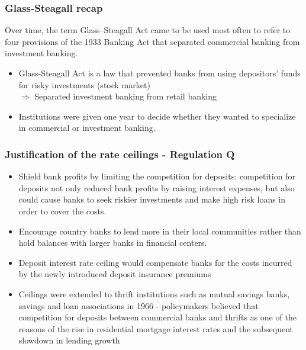 \documentclass[11pt]{beamer}
\begin{document}

\begin{frame}
\frametitle{Glass-Steagall recap}
Over time, the term Glass–Steagall Act came to be used most often to refer to four provisions of the 1933 Banking Act that separated commercial banking from investment banking.\\
\begin{itemize}
\item Glass-Steagall Act is a law that prevented banks from using depositors' funds for risky investments (stock market) \\$\Rightarrow$ Separated investment banking from retail banking
\item Institutions were given one year to decide whether they wanted to specialize in commercial or investment banking.
\end{itemize}
\end{frame}

\begin{frame}
\frametitle{Justification of the rate ceilings - Regulation Q}
\begin{itemize}
\item Shield bank profits by limiting the competition for
deposits: competition for deposits not only reduced bank profits by raising interest expenses, but also could cause banks to seek riskier investments and make high risk loans in order to cover the costs.
\item Encourage country banks to lend more in their local communities rather than hold balances with larger banks in financial centers.
\item {Deposit interest rate ceiling would compensate banks for the costs incurred by the newly introduced
deposit insurance premiums}
\item {Ceilings were extended to thrift institutions} such as
mutual savings banks, savings and loan associations in 1966 - policymakers believed that competition for deposits between commercial banks and thrifts as one of the reasons of the rise in residential mortgage interest rates and the subsequent slowdown in lending growth

\end{itemize}
\end{frame}
\end{document}
